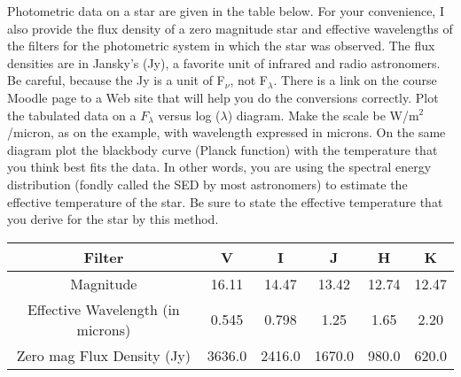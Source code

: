\documentclass[12pt]{article}
\newenvironment{problem}[2][Problem]{\begin{trivlist}
\item[\hskip \labelsep {\bfseries #1}\hskip \labelsep {\bfseries #2.}]}{\end{trivlist}}
\begin{document}
\bigskip
\bigskip






\begin{problem}{3}
Photometric data on a star are given in the table below. For your convenience, I also provide the flux density of a zero magnitude star and effective wavelengths of the filters for the photometric system in which the star was observed. The flux densities are in Jansky's (Jy), a favorite unit of infrared and radio astronomers. Be careful, because the Jy is a unit of F$_\nu$, not F$_\lambda$. There is a link on the course Moodle page to a Web site that will help you do the conversions correctly. Plot the tabulated data on a $F_\lambda$ versus log ($\lambda$) diagram. Make the scale be W/m$^2$/micron, as on the example, with wavelength expressed in microns. On the same diagram plot the blackbody curve (Planck function) with the temperature that you think best fits the data. In other words, you are using the spectral energy distribution (fondly called the SED by most astronomers) to estimate the effective temperature of the star. Be sure to state the effective temperature that you derive for the star by this method.
\bigskip
\smallskip

\begin{tabular} {cccccc}

Filter & V & I & J & H & K \\
\hline
\hline
Magnitude & 16.11 & 14.47 & 13.42 & 12.74 & 12.47 \\
Effective Wavelength (in microns) & 0.545 & 0.798 & 1.25 & 1.65 & 2.20 \\
Zero mag Flux Density (Jy) & 3636.0 & 2416.0 & 1670.0 & 980.0 & 620.0 \\
\hline

\end{tabular}

\end{problem}
\end{document}
